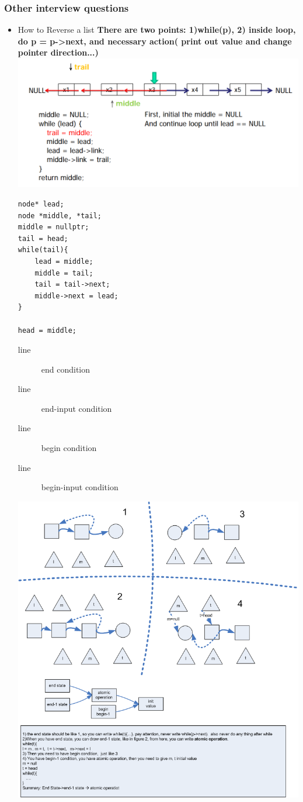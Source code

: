 \documentclass[a4paper,12pt,twoside]{book}
\begin{document}
\subsubsection{Other interview questions}
\begin{itemize}
\item How to Reverse a list \textbf{ There are two points: 1)while(p),  2) inside loop, do p = p->next, and necessary action( print out value and change pointer direction...)}
\includegraphics[scale=0.65]{pics/reverse.png} \newline


\begin{lstlisting}[breaklines]
node* lead; 
node *middle, *tail;
middle = nullptr;
tail = head;
while(tail){
	lead = middle;
	middle = tail;
	tail = tail->next;
	middle->next = lead;
}

head = middle;
\end{lstlisting}
\begin{description}
	\item[line] end condition
	\item[line] end-input condition
	\item[line] begin condition
	\item[line] begin-input condition
\end{description}
\includegraphics[scale=0.65]{pics/link.png} \newline


\end{itemize}
\end{document}

